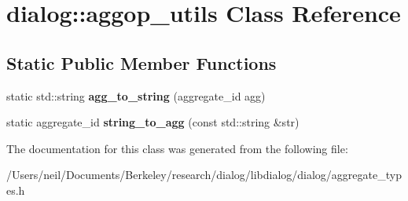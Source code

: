 \hypertarget{classdialog_1_1aggop__utils}{}\section{dialog\+:\+:aggop\+\_\+utils Class Reference}
\label{classdialog_1_1aggop__utils}
\subsection*{Static Public Member Functions}
\begin{DoxyCompactItemize}
\item 
\mbox{\label{classdialog_1_1aggop__utils_a6bb760aada4cba27b9b064bceae3d9cf}} 
static std\+::string {\bfseries agg\+\_\+to\+\_\+string} (aggregate\+\_\+id agg)
\item 
\mbox{\label{classdialog_1_1aggop__utils_a0932c67ff41845bc40722ba44bcccc19}} 
static aggregate\+\_\+id {\bfseries string\+\_\+to\+\_\+agg} (const std\+::string \&str)
\end{DoxyCompactItemize}


The documentation for this class was generated from the following file\+:\begin{DoxyCompactItemize}
\item 
/\+Users/neil/\+Documents/\+Berkeley/research/dialog/libdialog/dialog/aggregate\+\_\+types.\+h\end{DoxyCompactItemize}
